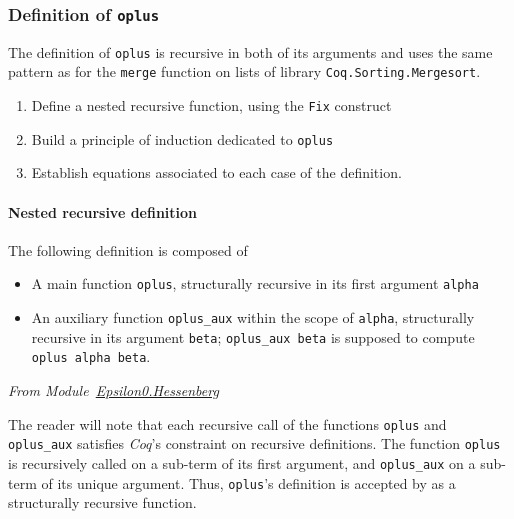     \subsubsection{Definition of \texttt{oplus}}
    \label{sec:orgheadline84}

    The definition of \texttt{oplus} is recursive in both of its 
    arguments and uses  the same pattern as for the \texttt{merge} function on lists of library
    \texttt{Coq.Sorting.Mergesort}.

    \begin{enumerate}
    \item Define a nested recursive function, using the \texttt{Fix} 
        construct

    \item Build a principle of induction dedicated to \texttt{oplus}

    \item Establish equations associated to each case of the definition.
    \end{enumerate}

    \paragraph{Nested recursive definition}
    \label{sec:orgheadline83}

    The following definition is composed of 
    \begin{itemize}
    \item A main function \texttt{oplus}, structurally recursive in its 
    first argument \texttt{alpha}
    \item An auxiliary function \texttt{oplus\_aux} within the scope of \texttt{alpha},
    structurally recursive in its argument \texttt{beta};  \texttt{oplus\_aux beta} 
       is supposed to compute  \texttt{oplus alpha beta}.
    \end{itemize}
      
    \vspace{4pt}
    \emph{From Module~\href{../theories/html/hydras.Epsilon0.Hessenberg.html\#oplus}{Epsilon0.Hessenberg}}

    \label{sect:infix-oplus}

    
    
 
    The reader will note that each recursive call of the functions
    \texttt{oplus} and \texttt{oplus\_aux} satisfies \emph{Coq}'s constraint
    on recursive definitions. The function \texttt{oplus} is recursively called on a sub-term of its first argument,
    and \texttt{oplus\_aux} on a sub-term of its unique argument.
    Thus, \texttt{oplus}'s definition is accepted by \coq{} as a structurally recursive function.


